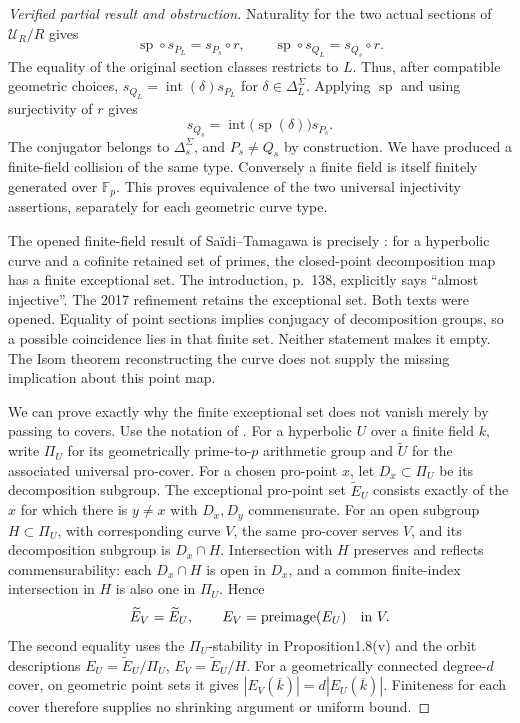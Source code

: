 \begin{proof}[Verified partial result and obstruction]
Naturality for the two actual sections of $\mathcal U_R/R$ gives
\[
 \operatorname{sp}\circ s_{P_L}=s_{P_s}\circ r,
 \qquad
 \operatorname{sp}\circ s_{Q_L}=s_{Q_s}\circ r.
\]
The equality of the original section classes restricts to $L$.
Thus, after compatible geometric choices,
$s_{Q_L}=\operatorname{int}(\delta)s_{P_L}$ for
$\delta\in\Delta_L^\Sigma$. Applying $\operatorname{sp}$ and using
surjectivity of $r$ gives
\[
 s_{Q_s}=\operatorname{int}\bigl(\operatorname{sp}(\delta)\bigr)s_{P_s}.
\]
The conjugator belongs to $\Delta_s^\Sigma$, and $P_s\ne Q_s$ by
construction. We have produced a finite-field collision of the
same type. Conversely a finite field is itself finitely generated
over $\mathbb F_p$. This proves equivalence of the two universal
injectivity assertions, separately for each geometric curve type.

The opened finite-field result of Sa\"idi--Tamagawa is precisely
\cite[Proposition 1.8(vi), Corollary 1.11(iii)]{AB_SaidiTamagawa2009}:
for a hyperbolic curve and a cofinite retained set of primes, the
closed-point decomposition map has a finite exceptional set. The
introduction, p.~138, explicitly says ``almost injective''. The 2017
refinement retains the exceptional set\cite[Definitions 1.1--1.4,
Theorem 1.9]{AB_SaidiTamagawa2017}. Both texts were opened.
Equality of point sections implies conjugacy of decomposition groups,
so a possible coincidence lies in that finite set. Neither statement
makes it empty. The Isom theorem reconstructing the curve does not
supply the missing implication about this point map.

We can prove exactly why the finite exceptional set does not vanish
merely by passing to covers. Use the notation of
\cite[Remark 1.2, Definition 1.5, Proposition 1.8]{AB_SaidiTamagawa2009}.
For a hyperbolic $U$ over a finite field $k$, write $\Pi_U$ for its
geometrically prime-to-$p$ arithmetic group and $\widetilde U$ for
the associated universal pro-cover. For a chosen pro-point $x$,
let $D_x\subset\Pi_U$ be its decomposition subgroup. The exceptional
pro-point set $\widetilde E_U$ consists exactly of the $x$ for which
there is $y\ne x$ with $D_x,D_y$ commensurate. For an open subgroup
$H\subset\Pi_U$, with corresponding curve $V$, the same pro-cover
serves $V$, and its decomposition subgroup is $D_x\cap H$.
Intersection with $H$ preserves and reflects commensurability:
each $D_x\cap H$ is open in $D_x$, and a common finite-index
intersection in $H$ is also one in $\Pi_U$. Hence
\[
 \widetilde E_V=\widetilde E_U,\qquad
 E_V=\operatorname{preimage}(E_U)\quad\hbox{in }V.
\]
The second equality uses the $\Pi_U$-stability in Proposition1.8(v)
and the orbit descriptions $E_U=\widetilde E_U/\Pi_U$,
$E_V=\widetilde E_U/H$. For a geometrically connected degree-$d$
cover, on geometric point sets it gives
$|E_V(\overline k)|=d|E_U(\overline k)|$. Finiteness for each cover
therefore supplies no shrinking argument or uniform bound.


\end{proof}
